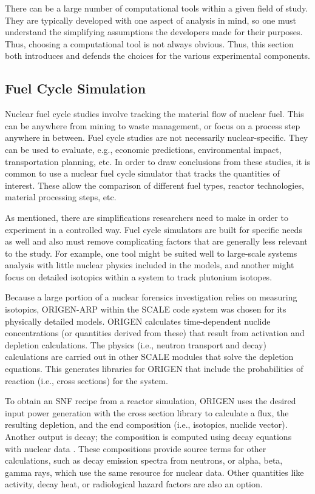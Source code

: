 There can be a large number of computational tools within a given field of
study.  They are typically developed with one aspect of analysis in mind, so
one must understand the simplifying assumptions the developers made for their
purposes. Thus, choosing a computational tool is not always obvious. Thus, this
section both introduces and defends the choices for the various experimental
components.

\subsection{Fuel Cycle Simulation}

Nuclear fuel cycle studies involve tracking the material flow of nuclear fuel.
This can be anywhere from mining to waste management, or focus on a process
step anywhere in between. Fuel cycle studies are not necessarily
nuclear-specific. They can be used to evaluate, e.g., economic predictions,
environmental impact, transportation planning, etc.  In order to draw
conclusions from these studies, it is common to use a nuclear fuel cycle
simulator that tracks the quantities of interest. These allow the comparison of
different fuel types, reactor technologies, material processing steps, etc. 

As mentioned, there are simplifications researchers need to make in order to
experiment in a controlled way. Fuel cycle simulators are built for specific
needs as well and also must remove complicating factors that are generally less
relevant to the study.  For example, one tool might be suited well to
large-scale systems analysis with little nuclear physics included in the
models, and another might focus on detailed isotopics within a system to track
plutonium isotopes.


Because a large portion of a nuclear forensics investigation relies on
measuring isotopics, \gls{ORIGEN-ARP} \cite{origen} within the \gls{SCALE} code
system was chosen for its physically detailed models. \gls{ORIGEN} calculates
time-dependent nuclide concentrations (or quantities derived from these) that
result from activation and depletion calculations. The physics (i.e., neutron
transport and decay) calculations are carried out in other \gls{SCALE} modules that
solve the depletion equations.  This generates libraries for \gls{ORIGEN} that
include the probabilities of reaction (i.e., cross sections) for the system.

To obtain an \gls{SNF} recipe from a reactor simulation, \gls{ORIGEN} uses the
desired input power generation with the cross section library to calculate a
flux, the resulting depletion, and the end composition (i.e., isotopics,
nuclide vector).  Another output is decay; the composition is computed using
decay equations with nuclear data \cite{endf}. These compositions provide
source terms for other calculations, such as decay emission spectra from
neutrons, or alpha, beta, gamma rays, which use the same resource for nuclear
data. Other quantities like activity, decay heat, or radiological hazard
factors are also an option.

